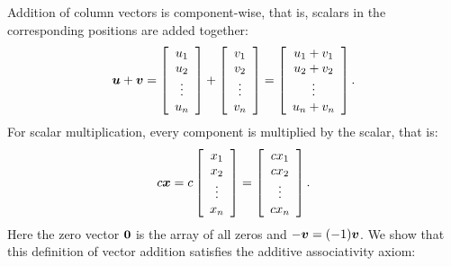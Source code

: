 \begin{Exam}
Addition of column vectors is component-wise, that is, scalars in the corresponding positions are added together:
\begin{equation} \bb u+ \bb v = \mtx{c}{u_1\\u_2\\\vdots\\u_n} + \mtx{c}{v_1\\v_2\\\vdots\\v_n} = \mtx{c}{u_1+v_1\\u_2+v_2\\\vdots\\u_n+v_n}. \end{equation}  For scalar multiplication, every component is multiplied by the scalar, that is:
\begin{equation} c\bb x = c\mtx{c}{x_1\\x_2\\\vdots\\x_n}= \mtx{c}{cx_1\\cx_2\\\vdots\\cx_n}. \end{equation}   Here the zero vector $\bb 0$ is the array of all zeros and $-\bb v=(-1)\bb v$. We show that this definition of vector addition satisfies the additive associativity axiom:

\end{Exam}
